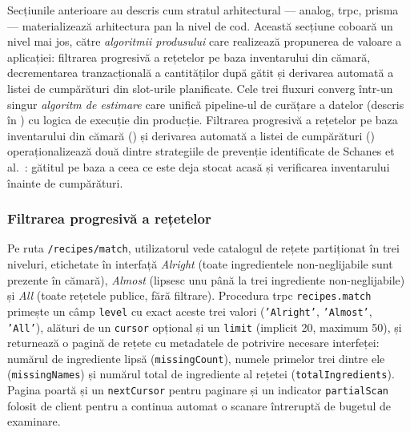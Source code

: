 Secțiunile anterioare au descris cum stratul arhitectural --- \gls{analog}, \acrshort{trpc}, \gls{prisma} --- materializează arhitectura \gls{pan} la nivel de cod. Această secțiune coboară un nivel mai jos, către \textit{algoritmii produsului} care realizează propunerea de valoare a aplicației: filtrarea progresivă a rețetelor pe baza inventarului din cămară, decrementarea tranzacțională a cantităților după gătit și derivarea automată a listei de cumpărături din slot-urile planificate. Cele trei fluxuri converg într-un singur \textit{algoritm de estimare} care unifică pipeline-ul de curățare a datelor (descris în ) cu logica de execuție din producție.
Filtrarea progresivă a rețetelor pe baza inventarului din cămară () și derivarea automată a listei de cumpărături () operaționalizează două dintre strategiile de prevenție identificate de Schanes et al.~\cite{schanes2018}: gătitul pe baza a ceea ce este deja stocat acasă și verificarea inventarului înainte de cumpărături.

\subsubsection{Filtrarea progresivă a rețetelor}\label{subsec:filtru-progresiv}

Pe ruta \texttt{/recipes/match}, utilizatorul vede catalogul de rețete partiționat în trei niveluri, etichetate în interfață \textit{Alright} (toate ingredientele non-neglijabile sunt prezente în cămară), \textit{Almost} (lipsesc unu până la trei ingrediente non-neglijabile) și \textit{All} (toate rețetele publice, fără filtrare). Procedura \gls{trpc} \texttt{recipes.match} primește un câmp \texttt{level} cu exact aceste trei valori (\texttt{'Alright'}, \texttt{'Almost'}, \texttt{'All'}), alături de un \texttt{cursor} opțional și un \texttt{limit} (implicit 20, maximum 50), și returnează o pagină de rețete cu metadatele de potrivire necesare interfeței: numărul de ingrediente lipsă (\texttt{missingCount}), numele primelor trei dintre ele (\texttt{missingNames}) și numărul total de ingrediente al rețetei (\texttt{totalIngredients}). Pagina poartă și un \texttt{nextCursor} pentru paginare și un indicator \texttt{partialScan} folosit de client pentru a continua automat o scanare întreruptă de bugetul de examinare.

